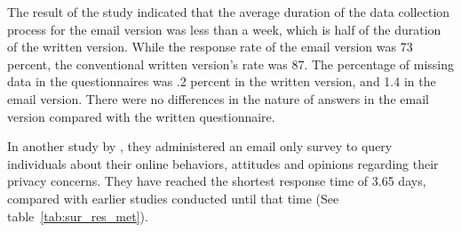 The result of the study indicated that the average duration of the data collection process for the email version was less than a week, which is half of the duration of the written version. While the response rate of the email version was 73 percent, the conventional written version's rate was 87. The percentage of missing data in the questionnaires was .2 percent in the written version, and 1.4 in the email version. There were no differences in the nature of answers in the email version compared with the written questionnaire.
\vspace{1cm}

In another study by \cite{Sheehan2006}, they administered an email only survey to query individuals about their online behaviors, attitudes and opinions regarding their privacy concerns. They have reached the shortest response time of 3.65 days, compared with earlier studies conducted until that time (See table~\ref{tab:sur_res_met}).

